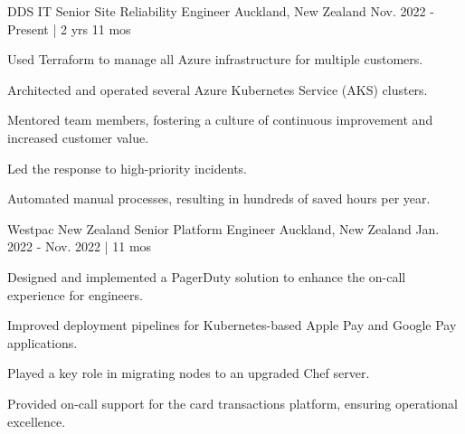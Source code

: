 


\begin{cventries}


\cventry
{DDS IT} %
{Senior Site Reliability Engineer} %
{Auckland, New Zealand} %
{Nov. 2022 - Present | 2 yrs 11 mos} %
{ %
\begin{cvitems}
\item {Used Terraform to manage all Azure infrastructure for multiple customers.}
\item {Architected and operated several Azure Kubernetes Service (AKS) clusters.}
\item {Mentored team members, fostering a culture of continuous improvement and increased customer value.}
\item {Led the response to high-priority incidents.}
\item {Automated manual processes, resulting in hundreds of saved hours per year.}
\end{cvitems}
}

\cventry
{Westpac New Zealand} %
{Senior Platform Engineer} %
{Auckland, New Zealand} %
{Jan. 2022 - Nov. 2022 | 11 mos} %
{ %
\begin{cvitems}
\item {Designed and implemented a PagerDuty solution to enhance the on-call experience for engineers.}
\item {Improved deployment pipelines for Kubernetes-based Apple Pay and Google Pay applications.}
\item {Played a key role in migrating nodes to an upgraded Chef server.}
\item {Provided on-call support for the card transactions platform, ensuring operational excellence.}
\end{cvitems}
}


\end{cventries}
